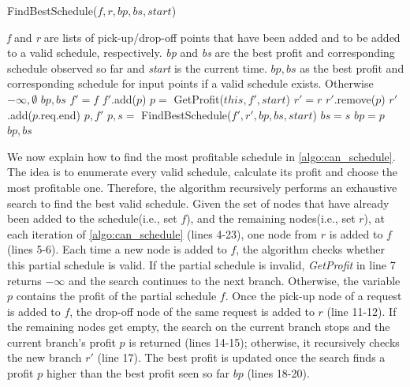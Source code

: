 \begin{algorithm}
\begin{algorithmic}[1]
\begin{algorithm}[!ht]
	\caption{FindBestSchedule($f, r, bp, bs, start$)}
	\label{algo:can_schedule}
	\begin{algorithmic}[1]
		\REQUIRE \emph{f} and \emph{r} are lists of pick-up/drop-off points that have been added and to be added to a valid schedule, respectively. \emph{bp} and \emph{bs} are the best profit and corresponding schedule observed so far and \emph{start} is the current time.
		\ENSURE $bp, bs$ as the best profit and corresponding schedule for input points if a valid schedule exists. Otherwise $-\infty, \emptyset$
		\RETURN $bp, bs$
		\ENDIF
		\STATE $f' = f$
		\STATE $f'$.add($p$)
		\STATE $p =$ GetProfit($this, f', start$)
		\STATE $r' = r$
		\STATE $r'$.remove($p$)
		\STATE $r'$.add($p$.req.end)\label{ln:dropoff}
		\ENDIF
		\RETURN $p, f'$
		\ENDIF
		\STATE $p, s =$ FindBestSchedule($f', r', bp, bs, start$)
		\STATE $bs = s$
		\STATE $bp = p$
		\ENDIF
		\ENDIF
		\ENDFOR
		\RETURN $bp, bs$
	\end{algorithmic} \vspace{-1mm}
\end{algorithm}

We now explain how to find the most profitable schedule in \cref{algo:can_schedule}. The idea is to enumerate every valid schedule, calculate its profit and choose the most profitable one. Therefore, the algorithm recursively performs an exhaustive search to find the best valid schedule. Given the set of nodes that have already been added to the schedule(i.e., set $f$), and the remaining nodes(i.e., set $r$), at each iteration of \cref{algo:can_schedule} (lines 4-23), one node from $r$ is added to $f$ (lines 5-6). Each time a new node is added to $f$, the algorithm checks whether this partial schedule is valid. If the partial schedule is invalid, \textit{GetProfit} in line 7 returns $-\infty$ and the search continues to the next branch. Otherwise, the variable $p$ contains the profit of the partial schedule $f$. Once the pick-up node of a request is added to $f$, the drop-off node of the same request is added to $r$ (line 11-12). If the remaining nodes get empty, the search on the current branch stops and the current branch's profit $p$ is returned (lines 14-15); otherwise, it recursively checks the new branch $r'$ (line 17). The best profit is updated once the search finds a profit $p$ higher than the best profit seen so far $bp$ (lines 18-20). 


\end{algorithmic}
\end{algorithm}
